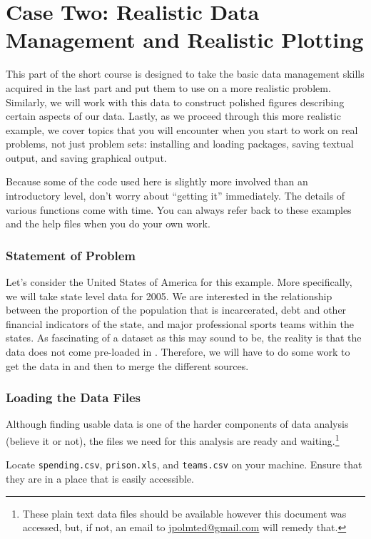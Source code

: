 \part{Case Two: Realistic Data Management and Realistic Plotting}

This part of the short course is designed to take the basic data
management skills acquired in the last part and put them to use on a
more realistic problem. Similarly, we will work with this data to
construct polished figures describing certain aspects of our
data. Lastly, as we proceed through this more realistic example, we
cover topics that you will encounter when you start to work on real
problems, not just problem sets: installing and loading packages,
saving textual output, and saving graphical output.

\par Because some of the code used here is slightly more involved than
an introductory level, don't worry about ``getting it''
immediately. The details of various functions come with time. You can
always refer back to these examples and the \R{} help files when you
do your own work.

\section{Statement of Problem}
Let's consider the United States of America for this example. More
specifically, we will take state level data for 2005. We are
interested in the relationship between the proportion of the
population that is incarcerated, debt and other financial indicators
of the state, and major professional sports teams within the
states. As fascinating of a dataset as this may sound to be, the
reality is that the data does not come pre-loaded in \R{}. Therefore,
we will have to do some work to get the data in \R{} and then to merge
the different sources.

\section{Loading the Data Files}
Although finding usable data is one of the harder components of data
analysis (believe it or not), the files we need for this analysis are
ready and waiting.\footnote{These plain text data files should be
  available however this document was accessed, but, if not, an email
  to \url{jpolmted@gmail.com} will remedy that.}

Locate \texttt{spending.csv}, \texttt{prison.xls}, and
\texttt{teams.csv} on your machine. Ensure that they are in a place
that is easily accessible.

